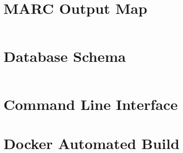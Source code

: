 \documentclass[10pt, a4paper]{article}
\begin{document}
\section{MARC Output Map}
\label{appendix:marc_output_map}
\inputminted{yaml}{appendices/output.yaml}

\pagebreak

\section{Database Schema}
\label{appendix:database_schema}
\inputminted{yaml}{appendices/schema.yaml}

\pagebreak
\onecolumn

\section{Command Line Interface}
\label{appendix:command_line_interface}


\pagebreak

\section{Docker Automated Build}
\label{appendix:docker_automated_build}

\end{document}
